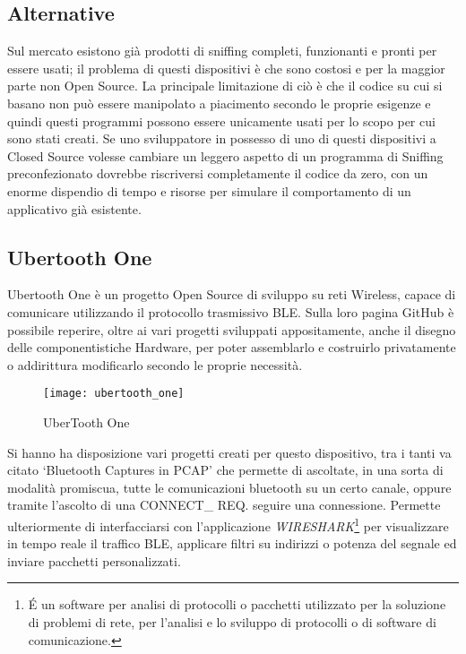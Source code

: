 \newpage 

\subsection{Alternative}
Sul mercato esistono già prodotti di sniffing completi, funzionanti e pronti per essere usati; il problema di questi dispositivi è che sono costosi e per la maggior parte non Open Source. La principale limitazione di ciò è che il codice su cui si basano non può essere manipolato a piacimento secondo le proprie esigenze e quindi questi programmi possono essere unicamente usati per lo scopo per cui sono stati creati. Se uno sviluppatore in possesso di uno di questi dispositivi a Closed Source volesse cambiare un leggero aspetto di un programma di Sniffing preconfezionato dovrebbe riscriversi completamente il codice da zero, con un enorme dispendio di tempo e risorse per simulare il comportamento di un applicativo già esistente.

\subsection*{Ubertooth One}
Ubertooth One è un progetto Open Source di sviluppo su reti Wireless, capace di comunicare utilizzando il protocollo trasmissivo BLE. Sulla loro pagina GitHub \cite{ubertooth_github_web} è possibile reperire, oltre ai vari progetti sviluppati appositamente, anche il disegno delle componentistiche Hardware, per poter assemblarlo e costruirlo privatamente o addirittura modificarlo secondo le proprie necessità.

\begin{figure}[H]
\texttt{[image: ubertooth\_one]}
\centering
\caption{UberTooth One}
\end{figure}

Si hanno ha disposizione vari progetti creati per questo dispositivo, tra i tanti va citato \lq Bluetooth Captures in PCAP\rq  \cite{ubertooth_pcap_web} che permette di ascoltate, in una sorta di modalità promiscua, tutte le comunicazioni bluetooth su un certo canale, oppure tramite l'ascolto di una CONNECT\_ REQ. seguire una connessione. Permette ulteriormente di interfacciarsi con l'applicazione \emph{WIRESHARK}\footnote{\'E un software per analisi di protocolli o pacchetti utilizzato per la soluzione di problemi di rete, per l'analisi e lo sviluppo di protocolli o di software di comunicazione.} per visualizzare in tempo reale il traffico BLE, applicare filtri su indirizzi o potenza del segnale ed inviare pacchetti personalizzati.

